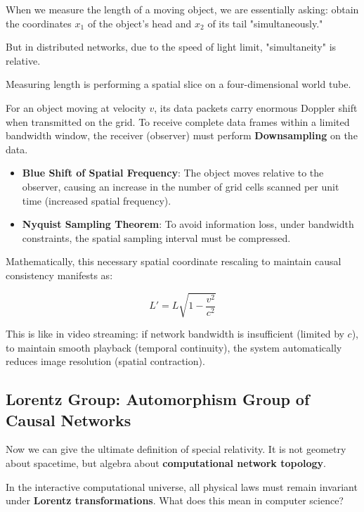 When we measure the length of a moving object, we are essentially asking: obtain the coordinates $x_1$ of the object's head and $x_2$ of its tail "simultaneously."

But in distributed networks, due to the speed of light limit, "simultaneity" is relative.

\begin{definition}
Measuring length is performing a spatial slice on a four-dimensional world tube.
\end{definition}

For an object moving at velocity $v$, its data packets carry enormous Doppler shift when transmitted on the grid. To receive complete data frames within a limited bandwidth window, the receiver (observer) must perform \textbf{Downsampling} on the data.

\begin{itemize}
\item \textbf{Blue Shift of Spatial Frequency}: The object moves relative to the observer, causing an increase in the number of grid cells scanned per unit time (increased spatial frequency).

\item \textbf{Nyquist Sampling Theorem}: To avoid information loss, under bandwidth constraints, the spatial sampling interval must be compressed.
\end{itemize}

Mathematically, this necessary spatial coordinate rescaling to maintain causal consistency manifests as:

\begin{equation}
L' = L \sqrt{1 - \frac{v^2}{c^2}}
\end{equation}

This is like in video streaming: if network bandwidth is insufficient (limited by $c$), to maintain smooth playback (temporal continuity), the system automatically reduces image resolution (spatial contraction).

\subsection{Lorentz Group: Automorphism Group of Causal Networks}

Now we can give the ultimate definition of special relativity. It is not geometry about spacetime, but algebra about \textbf{computational network topology}.

In the interactive computational universe, all physical laws must remain invariant under \textbf{Lorentz transformations}. What does this mean in computer science?


